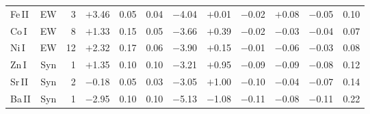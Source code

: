 \begin{table*}
\begin{tabular}{lcrrrrrccccc}
Fe\,II   &   EW   &  3   &  $+$3.46 &  0.05   & 0.04 &  $-$4.04   &  $+$0.01   &  $-$0.02 &  $+$0.08 & $-$0.05 & 0.10 \\
Co\,I    &   EW   &  8   &  $+$1.33 &  0.15   & 0.05 &  $-$3.66   &  $+$0.39   &  $-$0.02 &  $-$0.03 & $-$0.04 & 0.07 \\
Ni\,I    &   EW   & 12   &  $+$2.32 &  0.17   & 0.06 &  $-$3.90   &  $+$0.15   &  $-$0.01 &  $-$0.06 & $-$0.03 & 0.08 \\
Zn\,I    &   Syn  &  1   &  $+$1.35 &  0.10   & 0.10 &  $-$3.21   &  $+$0.95   &  $-$0.09 &  $-$0.09 & $-$0.08 & 0.12 \\
Sr\,II   &   Syn  &  2   &  $-$0.18 &  0.05   & 0.03 &  $-$3.05   &  $+$1.00   &  $-$0.10 &  $-$0.04 & $-$0.07 & 0.14 \\
Ba\,II   &   Syn  &  1   &  $-$2.95 &  0.10   & 0.10 &  $-$5.13   &  $-$1.08   &  $-$0.11 &  $-$0.08 & $-$0.11 & 0.22 \\
\hline
\end{tabular}
\\
\end{table*}








